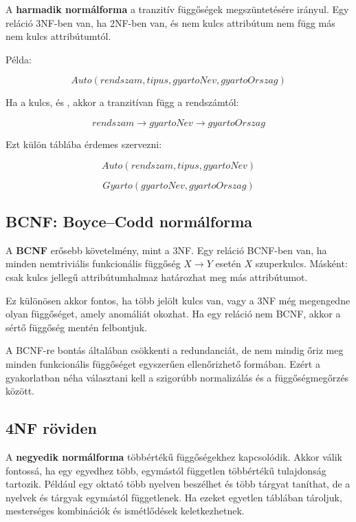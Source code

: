 A \textbf{harmadik normálforma} a tranzitív függőségek megszüntetésére irányul. Egy reláció 3NF-ben van, ha 2NF-ben van, és nem kulcs attribútum nem függ más nem kulcs attribútumtól.

Példa:

\[
  Auto(rendszam, tipus, gyartoNev, gyartoOrszag)
\]

Ha  a kulcs, és , akkor a  tranzitívan függ a rendszámtól:

\[
  rendszam \to gyartoNev \to gyartoOrszag
\]

Ezt külön táblába érdemes szervezni:

\[
  Auto(rendszam, tipus, gyartoNev)
\]

\[
  Gyarto(gyartoNev, gyartoOrszag)
\]

\subsection{BCNF: Boyce--Codd normálforma}

A \textbf{BCNF} erősebb követelmény, mint a 3NF. Egy reláció BCNF-ben van, ha minden nemtriviális funkcionális függőség \(X \to Y\) esetén \(X\) szuperkulcs. Másként: csak kulcs jellegű attribútumhalmaz határozhat meg más attribútumot.

Ez különösen akkor fontos, ha több jelölt kulcs van, vagy a 3NF még megengedne olyan függőséget, amely anomáliát okozhat. Ha egy reláció nem BCNF, akkor a sértő függőség mentén felbontjuk.


A BCNF-re bontás általában csökkenti a redundanciát, de nem mindig őriz meg minden funkcionális függőséget egyszerűen ellenőrizhető formában. Ezért a gyakorlatban néha választani kell a szigorúbb normalizálás és a függőségmegőrzés között.

\subsection{4NF röviden}

A \textbf{negyedik normálforma} többértékű függőségekhez kapcsolódik. Akkor válik fontossá, ha egy egyedhez több, egymástól független többértékű tulajdonság tartozik. Például egy oktató több nyelven beszélhet és több tárgyat taníthat, de a nyelvek és tárgyak egymástól függetlenek. Ha ezeket egyetlen táblában tároljuk, mesterséges kombinációk és ismétlődések keletkezhetnek.

